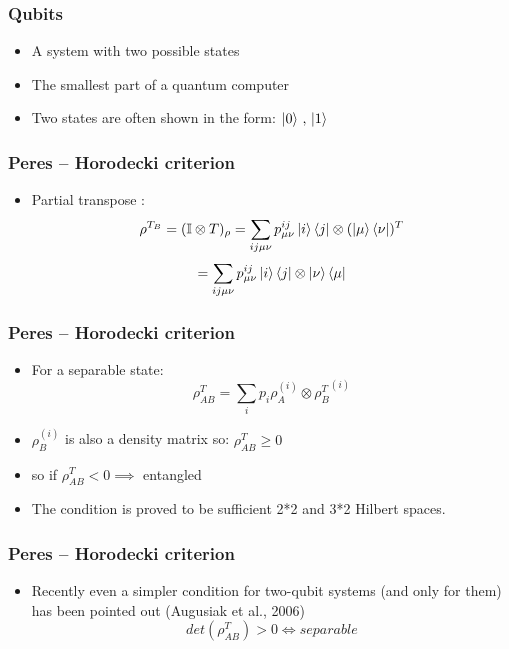 \documentclass[11pt]{beamer}
\begin{document}
\begin{frame}
\frametitle{Qubits}

\begin{itemize}
 \item  A system with two possible states
 \item  The smallest part of a quantum computer
 \item   Two states are often shown in the form: $\ket{0} \, , \, \ket{1}$ 
\end{itemize}

\end{frame}
\begin{frame}
\frametitle{Peres – Horodecki  criterion}

\begin{itemize}
 \item  Partial transpose : 
 $$ \rho^{T_B} = (\mathbb{I}\otimes T)_{\rho} = \sum_{ij\mu\nu}p^{ij}_{\mu\nu}\ket{i}\bra{j} \otimes (\ket{\mu}\bra{\nu})^T $$
 $$= \sum_{ij\mu\nu} p^{ij}_{\mu\nu} \ket{i}\bra{j} \otimes \ket{\nu}\bra{\mu}$$
\end{itemize}

\end{frame}

\begin{frame}
\frametitle{Peres – Horodecki  criterion}

\begin{itemize}
 \item  For a separable state:
 $$ \rho_{AB}^T = \sum_i p_i \rho_A^{(i)} \otimes {\rho_B^{T}}^{(i)}$$
 \item  $\rho_B^{(i)}$ is also a density matrix so: $\rho^T_{AB} \geqslant 0$
 \item   so if $\rho_{AB}^T < 0 \implies $ entangled 
 \item  The condition is proved to be sufficient 2*2 and 3*2 Hilbert spaces.
\end{itemize}

\end{frame}

\begin{frame}
\frametitle{Peres – Horodecki  criterion}

\begin{itemize}
 \item  Recently even a simpler condition for two-qubit systems 
(and only for them) has been pointed out  (Augusiak et al., 2006)
    $$det(\rho_{AB}^T) > 0 \iff separable$$ 

\end{itemize}

\end{frame}
\end{document}
